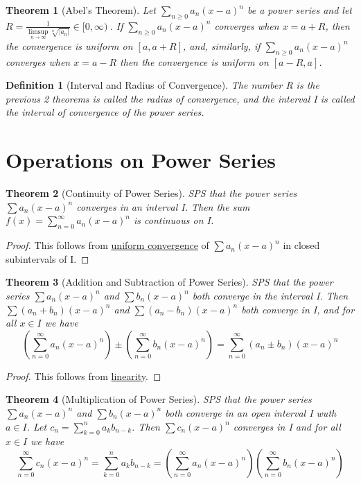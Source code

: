 \documentclass[11pt, oneside]{book}
\theoremstyle{break}
\newtheorem{thm}{Theorem}[section]
\newtheorem*{proof}{Proof}
\newtheorem{defn}{Definition}[section]
\begin{document}
\begin{thm}[Abel's Theorem]
	Let $\sum\limits_{n \geq 0} a_n (x - a)^n$ be a power series and let $R = \frac{1}{ \limsup\limits_{n \to \infty} \sqrt[n]{|a_n|} } \in [0, \infty)\ $. If $\sum_{n \geq 0} a_n (x - a)^n$ converges when $x = a + R$, then the convergence is uniform on $[a, a + R]$, and, similarly, if $\sum_{n \geq 0} a_n (x - a)^n$ converges when $x = a - R$ then the convergence is uniform on $[a - R, a]$.
\end{thm}

\begin{defn}[Interval and Radius of Convergence]
	The number R is the previous 2 theorems is called the radius of convergence, and the interval I is called the interval of convergence of the power series.
\end{defn}


\section{Operations on Power Series}

\begin{thm}[Continuity of Power Series]
	SPS that the power series $\sum a_n (x - a)^n$ converges in an interval I. Then the sum $f(x) = \sum_{n = 0}^{\infty} a_n (x - a)^n$ is continuous on I.
\end{thm}

\begin{proof}
	This follows from \hyperref[unif_conv_series_fn]{uniform convergence} of $\sum a_n (x - a)^n$ in closed subintervals of I.
\end{proof}

\begin{thm}[Addition and Subtraction of Power Series]
	SPS that the power series $\sum a_n (x-a)^n$ and $\sum b_n (x-a)^n$ both converge in the interval I. Then $\sum (a_n + b_n)(x-a)^n$ and $\sum (a_n - b_n)(x-a)^n$ both converge in I, and for all $x \in I$ we have
	\[
		\left( \sum_{n=0}^{\infty} a_n (x-a)^n \right) \pm \left( \sum_{n=0}^{\infty} b_n (x-a)^n \right) = \sum_{n=0}^{\infty} (a_n \pm b_n)(x-a)^n
	\]
\end{thm}

\begin{proof}
	This follows from \hyperref[series_linearity]{linearity}.
\end{proof}

\begin{thm}[Multiplication of Power Series]
	SPS that the power series $\sum a_n (x-a)^n$ and $\sum b_n (x-a)^n$ both converge in an open interval I wuth $a \in I$. Let $c_n = \sum\limits_{k=0}^{n} a_k b_{n-k}$. Then $\sum c_n (x-a)^n$ converges in I and for all $x \in I$ we have
	\[
		\sum_{n=0}^{\infty} c_n (x-a)^n = \sum\limits_{k=0}^{n} a_k b_{n-k} = \left( \sum_{n=0}^{\infty} a_n (x-a)^n \right) \left( \sum_{n=0}^{\infty} b_n (x-a)^n \right)
	\]
\end{thm}
\end{document}
